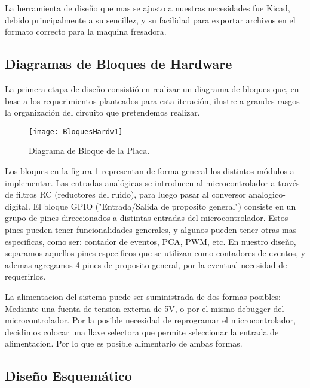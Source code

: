 La herramienta de diseño que mas se ajusto a nuestras necesidades fue Kicad, debido principalmente a su sencillez, y su facilidad para exportar archivos en el formato correcto para la maquina fresadora.


\subsection{Diagramas de Bloques de Hardware}
\label{it3:sub:diagrama_de_bloques_de_hardware}

La primera etapa de diseño consistió en realizar un diagrama de bloques que, en base a los requerimientos planteados para esta iteración, ilustre a grandes rasgos la organización del circuito que pretendemos realizar.

\begin{figure}[h]
  \centering
  \texttt{[image: BloquesHardw1]}
  \caption{Diagrama de Bloque de la Placa.}\label{fig:BloquesHardw1}
\end{figure}

Los bloques en la figura \ref{fig:BloquesHardw1} representan de forma general los distintos módulos a implementar. Las entradas analógicas se introducen al microcontrolador a través de filtros RC (reductores del ruido), para luego pasar al conversor analogico-digital. El bloque GPIO ("Entrada/Salida de proposito general") consiste en un grupo de pines direccionados a distintas entradas del microcontrolador. Estos pines pueden tener funcionalidades generales, y algunos pueden tener otras mas especificas, como ser: contador de eventos, PCA, PWM, etc. En nuestro diseño, separamos aquellos pines especificos que se utilizan como contadores de eventos, y ademas agregamos 4 pines de proposito general, por la eventual necesidad de requerirlos. 

La alimentacion del sistema puede ser suministrada de dos formas posibles: Mediante una fuenta de tension externa de 5V, o por el mismo debugger del microcontrolador. Por la posible necesidad de reprogramar el microcontrolador, decidimos colocar una llave selectora que permite seleccionar la entrada de alimentacion. Por lo que es posible alimentarlo de ambas formas.


\subsection{Diseño Esquemático}
\label{it3:sub:diseno_esquematico}

